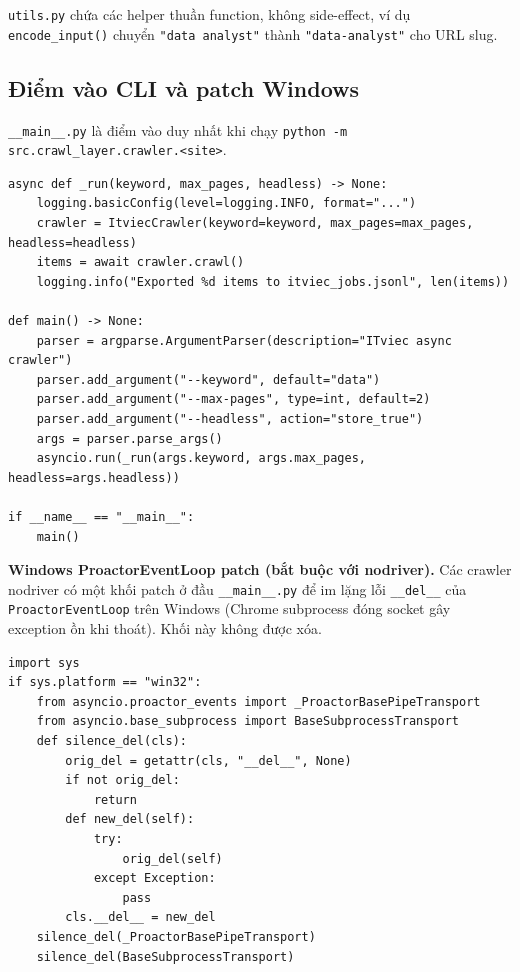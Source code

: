 \texttt{utils.py} chứa các helper thuần function, không side-effect, ví dụ
\texttt{encode\_input()} chuyển \texttt{"data analyst"} thành
\texttt{"data-analyst"} cho URL slug.


\subsection{Điểm vào CLI và patch Windows}
\label{subsec:crawl-main}

\texttt{\_\_main\_\_.py} là điểm vào duy nhất khi chạy
\texttt{python -m src.crawl\_layer.crawler.<site>}.

\begin{lstlisting}[caption={Entry point CLI (src/crawl\_layer/crawler/itviec/\_\_main\_\_.py)},label={lst:main}]
async def _run(keyword, max_pages, headless) -> None:
    logging.basicConfig(level=logging.INFO, format="...")
    crawler = ItviecCrawler(keyword=keyword, max_pages=max_pages, headless=headless)
    items = await crawler.crawl()
    logging.info("Exported %d items to itviec_jobs.jsonl", len(items))

def main() -> None:
    parser = argparse.ArgumentParser(description="ITviec async crawler")
    parser.add_argument("--keyword", default="data")
    parser.add_argument("--max-pages", type=int, default=2)
    parser.add_argument("--headless", action="store_true")
    args = parser.parse_args()
    asyncio.run(_run(args.keyword, args.max_pages, headless=args.headless))

if __name__ == "__main__":
    main()
\end{lstlisting}

\textbf{Windows ProactorEventLoop patch (bắt buộc với nodriver).} Các crawler
nodriver có một khối patch ở đầu \texttt{\_\_main\_\_.py} để im lặng lỗi
\texttt{\_\_del\_\_} của \texttt{ProactorEventLoop} trên Windows (Chrome
subprocess đóng socket gây exception ồn khi thoát). Khối này không được xóa.

\begin{lstlisting}[caption={Patch Windows cho nodriver (đặt ở đầu \_\_main\_\_.py)},label={lst:winpatch}]
import sys
if sys.platform == "win32":
    from asyncio.proactor_events import _ProactorBasePipeTransport
    from asyncio.base_subprocess import BaseSubprocessTransport
    def silence_del(cls):
        orig_del = getattr(cls, "__del__", None)
        if not orig_del:
            return
        def new_del(self):
            try:
                orig_del(self)
            except Exception:
                pass
        cls.__del__ = new_del
    silence_del(_ProactorBasePipeTransport)
    silence_del(BaseSubprocessTransport)
\end{lstlisting}


